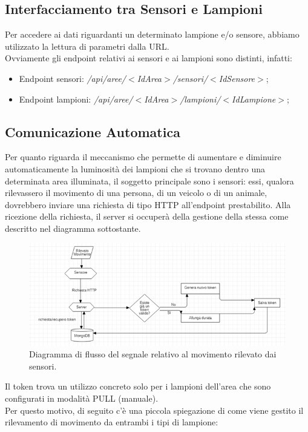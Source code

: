 \documentclass[a4paper, 11pt]{article}
\begin{document}
\subsection{Interfacciamento tra Sensori e Lampioni}
Per accedere ai dati riguardanti un determinato lampione e/o sensore, abbiamo utilizzato la lettura di parametri dalla URL.\\ Ovviamente gli endpoint relativi ai sensori e ai lampioni sono distinti, infatti:
\begin{itemize}
    \item Endpoint sensori: \textit{/api/aree/$<$IdArea$>$/sensori/$<$IdSensore$>$};
    \item Endpoint lampioni: \textit{/api/aree/$<$IdArea$>$/lampioni/$<$IdLampione$>$};
\end{itemize}
\subsection{Comunicazione Automatica}
Per quanto riguarda il meccanismo che permette di aumentare e diminuire automaticamente la luminosità dei lampioni che si trovano dentro una determinata area illuminata, il soggetto principale sono i sensori: essi, qualora rilevassero il movimento di una persona, di un veicolo o di un animale, dovrebbero inviare una richiesta di tipo HTTP all'endpoint prestabilito. Alla ricezione della richiesta, il server si occuperà della gestione della stessa come descritto nel diagramma sottostante.
\begin{figure}[H]
    \centering
    \includegraphics[width=\textwidth]{sensori}
    \caption{Diagramma di flusso del segnale relativo al movimento rilevato dai sensori.}
\end{figure}
Il token trova un utilizzo concreto solo per i lampioni dell'area che sono configurati in modalità PULL (manuale).\\
Per questo motivo, di seguito c'è una piccola spiegazione di come viene gestito il rilevamento di movimento da entrambi i tipi di lampione:
\end{document}
